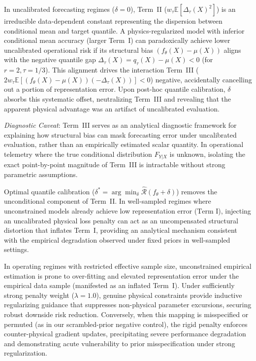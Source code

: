 \begin{remark}
\label{rem:masking}
In uncalibrated forecasting regimes ($\delta=0$), Term~II ($w_\tau \mathbb{E}[\Delta_\tau(X)^2]$) is an irreducible data-dependent constant representing the dispersion between conditional mean and target quantile. A physics-regularized model with inferior conditional mean accuracy (larger Term~I) can paradoxically achieve lower uncalibrated operational risk if its structural bias $(f_\theta(X) - \mu(X))$ aligns with the negative quantile gap $\Delta_\tau(X) = q_\tau(X) - \mu(X) < 0$ (for $r=2, \tau=1/3$). This alignment drives the interaction Term~III ($2 w_\tau \mathbb{E}[(f_\theta(X) - \mu(X))(-\Delta_\tau(X))] < 0$) negative, accidentally cancelling out a portion of representation error. Upon post-hoc quantile calibration, $\delta$ absorbs this systematic offset, neutralizing Term~III and revealing that the apparent physical advantage was an artifact of uncalibrated evaluation.

\textit{Diagnostic Caveat}: Term~III serves as an analytical diagnostic framework for explaining how structural bias can mask forecasting error under uncalibrated evaluation, rather than an empirically estimated scalar quantity. In operational telemetry where the true conditional distribution $F_{Y|X}$ is unknown, isolating the exact point-by-point magnitude of Term~III is intractable without strong parametric assumptions.
\end{remark}

\begin{remark}
\label{rem:exposure}
Optimal quantile calibration ($\delta^* = \arg\min_\delta \hat{\mathcal{R}}(f_\theta + \delta)$) removes the unconditional component of Term~II. In well-sampled regimes where unconstrained models already achieve low representation error ($\text{Term~I}$), injecting an uncalibrated physical loss penalty can act as an uncompensated structural distortion that inflates Term~I, providing an analytical mechanism consistent with the empirical degradation observed under fixed priors in well-sampled settings.
\end{remark}

\begin{remark}
\label{rem:inductive_guidance}
In operating regimes with restricted effective sample size, unconstrained empirical estimation is prone to over-fitting and elevated representation error under the empirical data sample (manifested as an inflated Term~I). Under sufficiently strong penalty weight ($\lambda=1.0$), genuine physical constraints provide inductive regularizing guidance that suppresses non-physical parameter excursions, securing robust downside risk reduction. Conversely, when this mapping is misspecified or permuted (as in our scrambled-prior negative control), the rigid penalty enforces counter-physical gradient updates, precipitating severe performance degradation and demonstrating acute vulnerability to prior misspecification under strong regularization.
\end{remark}

